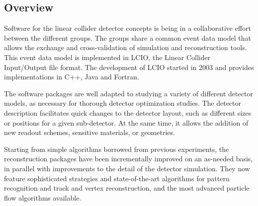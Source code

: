 \subsection{Overview}
Software for the linear collider detector concepts is being in a collaborative effort between the different groups. The groups share a common event data model that allows the exchange and cross-validation of simulation and reconstruction tools. This event data model is implemented in LCIO, the Linear Collider Input/Output file format. The development of LCIO started in 2003 and provides implementations in C++, Java and Fortran.

The software packages are well adapted to studying a variety of different detector models, as necessary for thorough detector optimization studies. The detector description facilitates quick changes to the detector layout, such as different sizes or positions for a given sub-detector. At the same time, it allows the addition of new readout schemes, sensitive materials, or geometries.

Starting from simple algorithms borrowed from previous experiments, the reconstruction packages have been incrementally improved on an as-needed basis, in parallel with improvements to the detail of the detector simulation. They now feature sophisticated strategies and state-of-the-art algorithms for pattern recognition and track and vertex reconstruction, and the most advanced particle flow algorithms available.
